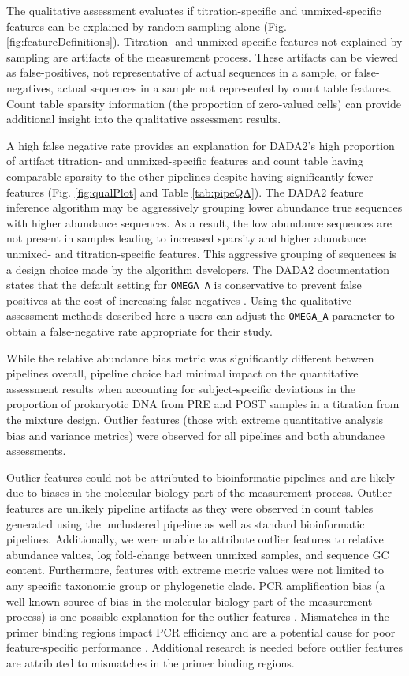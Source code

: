 \documentclass[linenumbers]{bmcart}
\begin{document}
The qualitative assessment evaluates if titration-specific and unmixed-specific features can be explained by random sampling alone (Fig. \ref{fig:featureDefinitions}).
Titration- and unmixed-specific features not explained by sampling are artifacts of the measurement process.
These artifacts can be viewed as false-positives, not representative of actual sequences in a sample, or false-negatives, actual sequences in a sample not represented by count table features.
Count table sparsity information (the proportion of zero-valued cells) can provide additional insight into the qualitative assessment results.

A high false negative rate provides an explanation for DADA2's high proportion of artifact titration- and unmixed-specific features and count table having comparable sparsity to the other pipelines despite having significantly fewer features (Fig. \ref{fig:qualPlot} and Table \ref{tab:pipeQA}).
The DADA2 feature inference algorithm may be aggressively grouping lower abundance true sequences with higher abundance sequences.
As a result, the low abundance sequences are not present in samples leading to increased sparsity and higher abundance unmixed- and titration-specific features.
This aggressive grouping of sequences is a design choice made by the algorithm developers.
The DADA2 documentation states that the default setting for \texttt{OMEGA\_A} is conservative to prevent false positives at the cost of increasing false negatives \cite{callahan2016dada2}.
Using the qualitative assessment methods described here a users can adjust the \texttt{OMEGA\_A} parameter to obtain a false-negative rate appropriate for their study.

While the relative abundance bias metric was significantly different
between pipelines overall, pipeline choice had minimal impact on the
quantitative assessment results when accounting for subject-specific deviations in the proportion of prokaryotic DNA from PRE and POST samples in a titration from the mixture design. Outlier features (those with extreme quantitative analysis bias
and variance metrics) were observed for all pipelines and both abundance assessments.

Outlier features could not be attributed to bioinformatic pipelines and are likely due to biases in the molecular biology part of the measurement process.
Outlier features are unlikely pipeline artifacts as they were observed in count tables generated
using the unclustered pipeline as well as standard bioinformatic
pipelines. Additionally, we were unable to attribute outlier features to relative
abundance values, log fold-change between unmixed samples, and sequence
GC content. Furthermore, features with extreme metric values were not limited to any
specific taxonomic group or phylogenetic clade. PCR amplification bias (a well-known source of bias in the molecular biology part of the
measurement process) is one possible explanation for the outlier features \cite{Sze565598}.
Mismatches in the primer binding regions impact PCR efficiency and are a potential cause for poor feature-specific
performance \cite{wright2014exploiting}. Additional research is needed before outlier features are attributed to mismatches in the primer binding regions.
\end{document}
